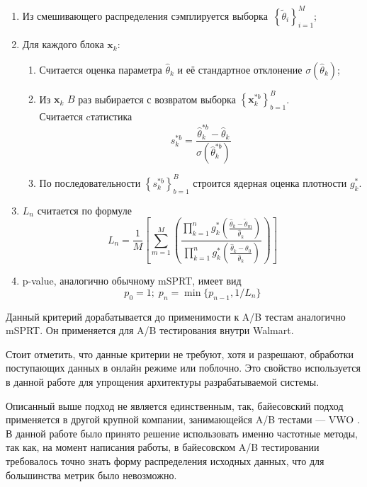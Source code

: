 \documentclass[../document.tex]{subfiles}
\begin{document}
	\begin{enumerate}
		\item Из смешивающего распределения сэмплируется выборка~$\left\{\tilde{\theta}_i\right\}_{i=1}^{M}$;
		\item Для каждого блока $\textbf{x}_k$:
		\begin{enumerate}
			\item Считается оценка параметра $\hat{\theta}_k$ и её стандартное отклонение $\sigma(\hat{\theta}_k)$;
			\item Из $\textbf{x}_k$ $B$ раз выбирается с возвратом выборка $\left\{\textbf{x}_k^{*b}\right\}_{b=1}^{B}$.\\Считается cтатистика
			\begin{equation}
				s_k^{*b}=\frac{\hat{\theta}_k^{*b} - \hat{\theta}_k}{\sigma(\hat{\theta}_k^{*b})}
			\end{equation}
			\item По последовательности $\left\{s_k^{*b}\right\}_{b=1}^{B}$ строится ядерная оценка плотности $g^{*}_k$.
		\end{enumerate}
		\item $L_n$ считается по формуле
		\begin{equation}
			L_n = \frac{1}{M}\left[
				\sum\limits_{m=1}^{M}\left(
					\frac{
						\prod_{k=1}^{n} g^{*}_k\left(\frac{\hat{\theta}_k - \tilde{\theta}_m}{\hat{\theta}_k}\right)
					}{
						\prod_{k=1}^{n} g^{*}_k\left(\frac{\hat{\theta}_k - \theta_0}{\hat{\theta}_k}\right)
					}
				\right)
			\right]
		\end{equation}
		\item p-value, аналогично обычному mSPRT, имеет вид
		\begin{equation}
			\label{eqn:bootstrap_mSPRT}
			p_0=1;\;p_n=\min\{p_{n-1},1/L_n\}
		\end{equation}
	\end{enumerate}
	\par Данный критерий дорабатывается до применимости к A/B тестам аналогично mSPRT. Он применяется для A/B тестирования внутри Walmart.
	\par Стоит отметить, что данные критерии не требуют, хотя и разрешают, обработки поступающих данных в онлайн режиме или поблочно. Это свойство используется в данной работе для упрощения архитектуры разрабатываемой системы.
	\par Описанный выше подход не является единственным, так, байесовский подход \cite{stucchio_bayesian} применяется в другой крупной компании, занимающейся A/B тестами --- VWO \cite{vwo}. В данной работе было принято решение использовать именно частотные методы, так как, на момент написания работы, в байесовском A/B тестировании требовалось точно знать форму распределения исходных данных, что для большинства метрик было невозможно.
\end{document}
